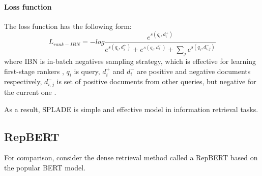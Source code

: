 \documentclass[
    twocolumn,
]{ceurart}
\begin{document}
    \paragraph{Loss function}
    The loss function has the following form:
    \begin{equation}
        L_{rank-IBN}=-log
        \frac{
            e^{s(q_i,d_i^+)}
        }{
            e^{s(q_i,d_i^+)} +
            e^{s(q_i,d_i^-)} +
            \sum_j e^{s(q_i,d_{i,j}^-)}
        }
    \end{equation}
    where IBN is in-batch negatives sampling strategy, which is effective for learning first-stage
    rankers \cite{IBN1,IBN2,IBN3}, $q_i$ is query, $d_i^+$ and $d_i^-$ are positive and negative
    documents respectively, ${d_{i,j}^-}$ is set of positive documents from other queries,
    but negative for the current one \cite{SPLADE}.\\\par
    As a result, SPLADE is simple and effective model in information retrieval tasks.

    \subsection{RepBERT}

    For comparison, consider the dense retrieval method called a RepBERT based
    on the popular BERT model.
\end{document}
